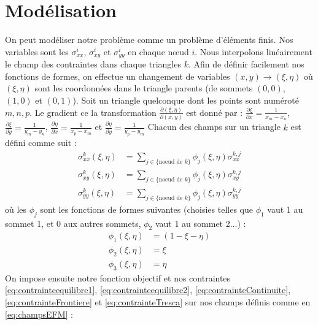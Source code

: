 \newpage
\section{Modélisation}
On peut modéliser notre problème comme un problème d'éléments finis. Nos variables sont les $\sigma_{xx}^i$, $\sigma_{xy}^i$ et $\sigma_{yy}^i$ en chaque nœud $i$. Nous interpolons linéairement le champ des contraintes dans chaque triangles $k$.
Afin de définir facilement nos fonctions de formes, on effectue un changement de variables $(x,y)\rightarrow (\xi,\eta)$ où $(\xi, \eta)$ sont les coordonnées dans le triangle parents (de sommets $(0,0)$, $(1,0)$ et $(0,1)$). 
Soit un triangle quelconque dont les points sont numéroté $m,n,p$. 
Le gradient ce la transformation $\frac{\partial (\xi,\eta)}{\partial (x,y)}$ est donné par  : $\frac{\partial \xi}{\partial x} = \frac{1}{x_m - x_n}$, $\frac{\partial \xi}{\partial y} = \frac{1}{y_m - y_n}$, $\frac{\partial \eta}{\partial x} = \frac{1}{x_p - x_m}$ et $\frac{\partial \eta}{\partial y} = \frac{1}{y_p - y_m}$
Chacun des champs sur un triangle $k$ est défini comme suit : 
\begin{equation} \label{eq:champsEFM}
\begin{aligned}
\sigma_{xx}^k (\xi,\eta) &= \sum_{j \in \{\text{noeud de $k$}\}} \phi_j (\xi,\eta) \sigma_{xx}^{k,j}\\
\sigma_{xy}^k (\xi,\eta) &= \sum_{j \in \{\text{noeud de $k$}\}} \phi_j (\xi,\eta) \sigma_{xy}^{k,j}\\
\sigma_{yy}^k (\xi,\eta) &= \sum_{j \in \{\text{noeud de $k$}\}} \phi_j (\xi,\eta) \sigma_{yy}^{k,j}
\end{aligned}
\end{equation}
où les $\phi_j$ sont les fonctions de formes suivantes (choisies telles que $\phi_1$ vaut 1 au sommet 1, et 0 aux autres sommets, $\phi_2$ vaut 1 au sommet 2...) : 
\begin{equation}
\begin{aligned}
\phi_1 (\xi,\eta) &= (1- \xi - \eta)\\
\phi_2 (\xi,\eta) &= \xi\\
\phi_3 (\xi,\eta) &= \eta
\end{aligned}
\end{equation}
On impose ensuite notre fonction objectif et nos contraintes \eqref{eq:contrainteequilibre1}, \eqref{eq:contrainteequilibre2}, \eqref{eq:contrainteContinuite}, \eqref{eq:contrainteFrontiere} et \eqref{eq:contrainteTresca} sur nos champs définis comme en \eqref{eq:champsEFM} :
